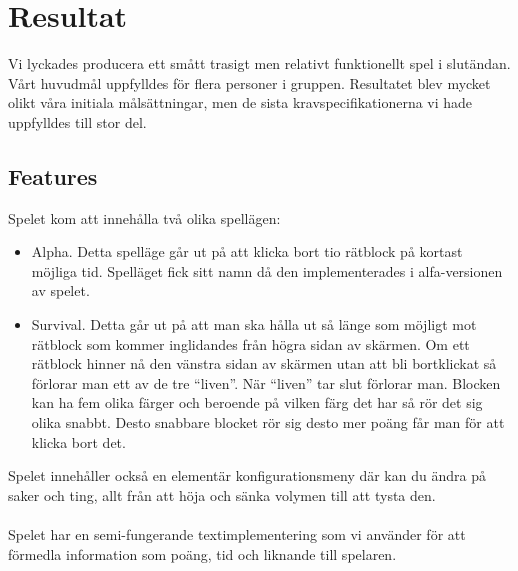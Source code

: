 \documentclass[a4paper]{article}
\begin{document}
\newpage
\section{Resultat}
Vi lyckades producera ett smått trasigt men relativt funktionellt spel i slutändan. Vårt huvudmål uppfylldes för flera personer i gruppen. Resultatet blev mycket olikt våra initiala målsättningar, men de sista kravspecifikationerna vi hade uppfylldes till stor del.

\subsection{Features}
Spelet kom att innehålla två olika spellägen:

\begin{itemize}

\item Alpha. Detta spelläge går ut på att klicka bort tio rätblock på kortast möjliga tid. Spelläget fick sitt namn då den implementerades i alfa-versionen av spelet.

\item Survival. Detta går ut på att man ska hålla ut så länge som möjligt mot rätblock som kommer inglidandes från högra sidan av skärmen. Om ett rätblock hinner nå den vänstra sidan av skärmen utan att bli bortklickat så förlorar man ett av de tre “liven”. När “liven” tar slut förlorar man. Blocken kan ha fem olika färger och beroende på vilken färg det har så rör det sig olika snabbt. Desto snabbare blocket rör sig desto mer poäng får man för att klicka bort det.

\end{itemize}
Spelet innehåller också en elementär konfigurationsmeny där kan du ändra på saker och ting, allt från att höja och sänka volymen till att tysta den.
\\
\\
Spelet har en semi-fungerande textimplementering som vi använder för att förmedla information som poäng, tid och liknande till spelaren.
\end{document}
